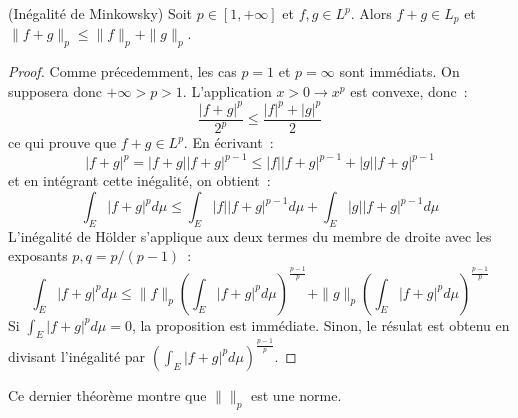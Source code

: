\begin{mandatory}
 \begin{theorem}{(Inégalité de Minkowsky)}
Soit $p\in [1,+\infty]$ et $f,g \in L^p$. Alors $f+g \in L_p$ et
$\|f+g\|_p \leq \|f\|_p + \|g\|_p$.
\end{theorem}
\end{mandatory}
\begin{proof}
Comme précedemment, les cas $p=1$ et $p=\infty$ sont immédiats. On
supposera donc $+\infty > p > 1$. L'application $x>0 \to x^p$ est
convexe, donc~:
\[
\frac{|f+g|^p}{2^p} \leq \frac{|f|^p + |g|^p}{2}
\]
ce qui prouve que $f+g \in L^p$. En écrivant~:
\[
|f+g|^p =
|f+g||f+g|^{p-1} \leq |f| |f+g|^{p-1} + |g||f+g|^{p-1}
\]
et en intégrant cette inégalité, on obtient~:
\[
\int_E |f+g|^p d \mu \leq \int_E |f||f+g|^{p-1} d \mu + \int_E
|g||f+g|^{p-1} d \mu
\]
L'inégalité de Hölder s'applique aux deux termes du membre de droite avec les
exposants $p,q=p/(p-1)$~:
\[
\int_E |f+g|^p d \mu \leq \|f\|_p \left (\int_E |f+g|^p d \mu \right)
^{\frac{p-1}{p}}
+ \|g\|_p \left (\int_E |f+g|^p d \mu \right )^{\frac{p-1}{p}}
\]
Si $\int_E |f+g|^p d \mu =0$, la proposition est immédiate. Sinon, le
résulat est obtenu en divisant l'inégalité par $ \left (\int_E |f+g|^p d \mu \right )^{\frac{p-1}{p}}$.
\end{proof}
Ce dernier théorème montre que $\|\|_p$ est une norme.
